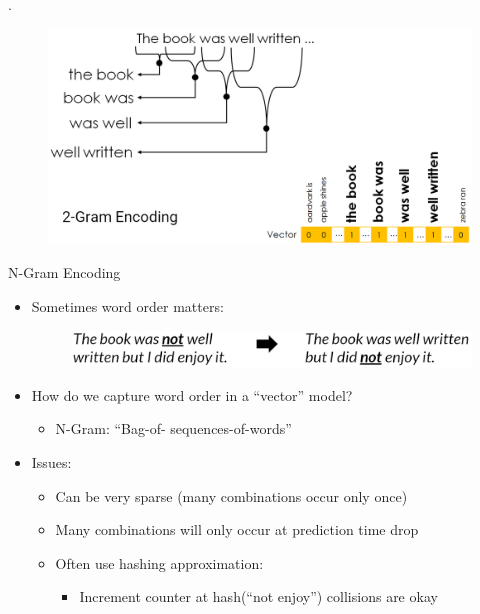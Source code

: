 \documentclass[aspectratio=169]{../latex_main/tntbeamer}  %
\begin{document}
	
	\begin{frame}{.}
	    \begin{figure}
	        \centering
	        \includegraphics[scale=.35]{Bild6}
	    \end{figure}
	\end{frame}
	
	
	\begin{frame}{N-Gram Encoding}
	    \begin{itemize}
	        \item Sometimes word order matters:
	        \begin{figure}
	            \includegraphics[scale=.35]{Bild5}
	        \end{figure}
	        \item How do we capture word order in a “vector” model?
	        \begin{itemize}
	            \item N-Gram: “Bag-of- sequences-of-words” 
	        \end{itemize}
	        \item Issues:
	        \begin{itemize}
	            \item Can be very sparse (many combinations occur only once)
	            \item Many combinations will only occur at prediction time drop
	            \item Often use hashing approximation:
	            \begin{itemize}
	                \item Increment counter at hash(“not enjoy”) collisions are okay
	            \end{itemize}
	        \end{itemize}
	    \end{itemize}
	\end{frame}
\end{document}
